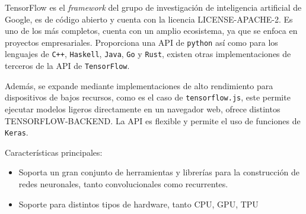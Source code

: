 TensorFlow \cite{Abadi_TensorFlow_Large-scale_machine_2015} es el \textit{framework} del grupo de investigación de inteligencia artificial de Google, es de código abierto y cuenta con la licencia \gls{LICENSE-APACHE-2}. Es uno de los más completos, cuenta con un amplio ecosistema, ya que se enfoca en proyectos empresariales. Proporciona una \gls{API} de \texttt{python} así como para los lenguajes de \texttt{C++}, \texttt{Haskell}, \texttt{Java}, \texttt{Go} y \texttt{Rust}, existen otras implementaciones de terceros de la \gls{API} de \texttt{TensorFlow}.

Además, se expande mediante implementaciones de alto rendimiento para dispositivos de bajos recursos, como es el caso de \texttt{tensorflow.js}, este permite ejecutar modelos ligeros directamente en un navegador web, ofrece distintos \gls{TENSORFLOW-BACKEND}. La \gls{API} es flexible y permite el uso de funciones de \texttt{Keras}.

Características principales:
\begin{itemize}
    \item Soporta un gran conjunto de herramientas y librerías para la construcción de redes neuronales, tanto convolucionales como recurrentes.
    \item Soporte para distintos tipos de hardware, tanto \gls{CPU}, \gls{GPU}, \gls{TPU}
\end{itemize}


